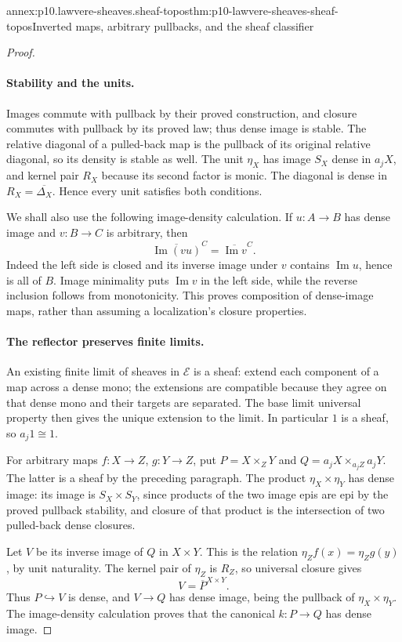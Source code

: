 \begin{annexitem}{annex:p10.lawvere-sheaves.sheaf-topos}{thm:p10-lawvere-sheaves-sheaf-topos}{Inverted maps, arbitrary pullbacks, and the sheaf classifier}
\begin{proof}
\paragraph{Stability and the units.}
Images commute with pullback by their proved construction,
and closure commutes with pullback by its proved law;
thus dense image is stable.  The relative diagonal
of a pulled-back map is the pullback of its original
relative diagonal, so its density is stable as well.
The unit \(\eta_X\) has image \(S_X\) dense in
\(a_jX\), and kernel pair \(R_X\) because its
second factor is monic.  The diagonal is dense
in \(R_X=\overline{\Delta_X}\).  Hence every
unit satisfies both conditions.

We shall also use the following image-density calculation.
If \(u:A\to B\) has dense image and \(v:B\to C\)
is arbitrary, then
\[
        \overline{\operatorname{Im}(vu)}^{C}
                  =\overline{\operatorname{Im}v}^{C}.
\]
Indeed the left side is closed and its inverse image
under \(v\) contains \(\operatorname{Im}u\), hence
is all of \(B\).  Image minimality puts
\(\operatorname{Im}v\) in the left side, while
the reverse inclusion follows from monotonicity.
This proves composition of dense-image maps, rather
than assuming a localization's closure properties.

\paragraph{The reflector preserves finite limits.}
An existing finite limit of sheaves in \(\mathcal E\)
is a sheaf: extend each component of a map across a
dense mono; the extensions are compatible because
they agree on that dense mono and their targets
are separated.  The base limit universal property
then gives the unique extension to the limit.
In particular \(1\) is a sheaf, so \(a_j1\cong1\).

For arbitrary maps \(f:X\to Z\), \(g:Y\to Z\),
put \(P=X\times_ZY\) and
\(Q=a_jX\times_{a_jZ}a_jY\).  The latter is a
sheaf by the preceding paragraph.  The product
\(\eta_X\times\eta_Y\) has dense image: its
image is \(S_X\times S_Y\), since products of
the two image epis are epi by the proved pullback
stability, and closure of that product is the
intersection of two pulled-back dense closures.

Let \(V\) be its inverse image of \(Q\) in
\(X\times Y\).  This is the relation
\(\eta_Zf(x)=\eta_Zg(y)\), by unit naturality.
The kernel pair of \(\eta_Z\) is \(R_Z\), so
universal closure gives
\[
                            V=\overline P^{X\times Y}.
\]
Thus \(P\hookrightarrow V\) is dense, and
\(V\to Q\) has dense image, being the pullback
of \(\eta_X\times\eta_Y\).  The image-density
calculation proves that the canonical \(k:P\to Q\)
has dense image.


\end{proof}
\end{annexitem}
